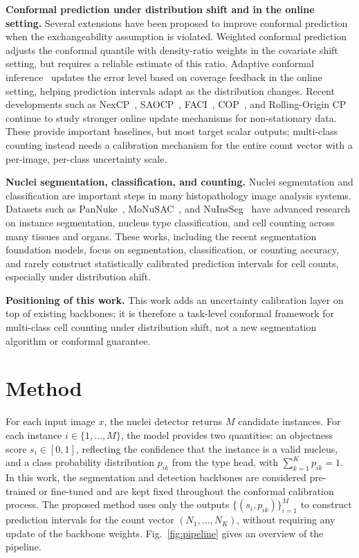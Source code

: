 \documentclass[smallextended,natbib]{svjour3}
\begin{document}
\textbf{Conformal prediction under distribution shift and in the online setting.}
Several extensions have been proposed to improve conformal prediction when the
exchangeability assumption is violated. Weighted conformal
prediction~\citep{tibshirani2019conformal} adjusts the conformal quantile with
density-ratio weights in the covariate shift setting, but requires a reliable
estimate of this ratio. Adaptive conformal
inference~\citep{gibbs2021adaptive} updates the error level based on coverage
feedback in the online setting, helping prediction intervals adapt as the
distribution changes. Recent developments such as NexCP~\citep{barber2023conformal},
SAOCP~\citep{bhatnagar2023improved}, FACI~\citep{gibbs2024conformal},
COP~\citep{hu2026conformal}, and Rolling-Origin CP~\citep{halkiewicz2026rolling}
continue to study stronger online update mechanisms for non-stationary data. These
provide important baselines, but most target scalar outputs; multi-class counting
instead needs a calibration mechanism for the entire count vector with a per-image,
per-class uncertainty scale.

\textbf{Nuclei segmentation, classification, and counting.}
Nuclei segmentation and classification are important steps in many histopathology
image analysis systems. Datasets such as PanNuke~\citep{gamper2019pannuke},
MoNuSAC~\citep{verma2021monusac}, and
NuInsSeg~\citep{mahbod2024nuinsseg} have advanced research on instance
segmentation, nucleus type classification, and cell counting across many tissues
and organs. These works, including the recent segmentation foundation models, focus
on segmentation, classification, or counting accuracy, and rarely construct
statistically calibrated prediction intervals for cell counts, especially under
distribution shift.

\textbf{Positioning of this work.}
This work adds an uncertainty calibration layer on top of existing backbones; it is
therefore a task-level conformal framework for multi-class cell counting under
distribution shift, not a new segmentation algorithm or conformal guarantee.

\FloatBarrier
\section{Method}\label{sec:method}

For each input image \(x\), the nuclei detector returns \(M\) candidate instances.
For each instance \(i \in \{1,\dots,M\}\), the model provides two quantities: an
objectness score \(s_i \in [0,1]\), reflecting the confidence that the instance is
a valid nucleus, and a class probability distribution \(p_{ik}\) from the type
head, with \(\sum_{k=1}^{K} p_{ik}=1\). In this work, the segmentation and
detection backbones are considered pre-trained or fine-tuned and are kept fixed
throughout the conformal calibration process. The proposed method uses only the
outputs \(\{(s_i,p_{ik})\}_{i=1}^{M}\) to construct prediction intervals for the
count vector \((N_1,\dots,N_K)\), without requiring any update of the backbone
weights. Fig.~\ref{fig:pipeline} gives an overview of the pipeline.
\end{document}
